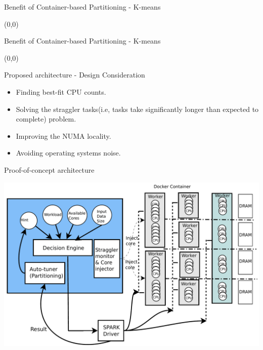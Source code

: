 \documentclass[english]{beamer} %
\begin{document}
\begin{frame}{Benefit of Container-based Partitioning - K-means}
\begin{textblock}{1}(0,0)
\end{textblock} 
\end{frame}



\begin{frame}{Benefit of Container-based Partitioning - K-means}
\begin{textblock}{1}(0,0)
\end{textblock} 
\end{frame}

\begin{frame}{Proposed architecture - Design Consideration}
    \begin{itemize}
    \item Finding best-fit CPU counts.
    \item Solving the straggler tasks(i.e, tasks take significantly longer than
    expected to complete) problem.
    \item Improving the NUMA locality.
    \item Avoiding operating systems noise.
    \end{itemize}
\end{frame}

\begin{frame}{Proof-of-concept architecture}
\begin{center}
\includegraphics[scale=0.4]{fig/jaildocker}
\end{center}
\end{frame}
\end{document}
